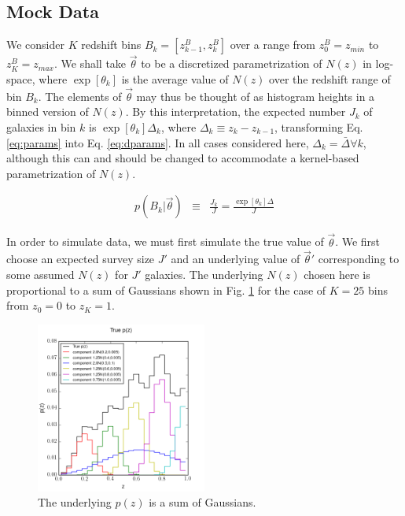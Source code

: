 \documentclass[preprint]{aastex}
\begin{document}
\subsection{Mock Data}
\label{sec:mock}

We consider $K$ redshift bins $B_{k}=[z^{B}_{k-1},z^{B}_{k}]$ over a range from $z^{B}_{0}=z_{min}$ to $z^{B}_{K}=z_{max}$.  We shall take $\vec{\theta}$ to be a discretized parametrization of $N(z)$ in log-space, where $\exp[\theta_{k}]$ is the average value of $N(z)$ over the redshift range of bin $B_{k}$.   The elements of $\vec{\theta}$ may thus be thought of as histogram heights in a binned version of $N(z)$.  By this interpretation, the expected number $J_{k}$ of galaxies in bin $k$ is $\exp[\theta_{k}]\Delta_{k}$, where $\Delta_{k}\equiv z_{k}-z_{k-1}$, transforming Eq. \ref{eq:params} into Eq. \ref{eq:dparams}.  In all cases considered here, $\Delta_{k}=\bar{\Delta}\forall k$, although this can and should be changed to accommodate a kernel-based parametrization of $N(z)$.

\begin{eqnarray}
\label{eq:dparams}
p(B_{k}|\vec{\theta}) &\equiv& \frac{J_{k}}{J} = \frac{\exp[\theta_{k}]\Delta}{J}
\end{eqnarray}

In order to simulate data, we must first simulate the true value of $\vec{\theta}$.  We first choose an expected survey size $J'$ and an underlying value of $\vec{\theta}'$ corresponding to some assumed $N(z)$ for $J'$ galaxies.  The underlying $N(z)$ chosen here is proportional to a sum of Gaussians shown in Fig. \ref{fig:physPz} for the case of $K=25$ bins from $z_{0}=0$ to $z_{K}=1$.

\begin{figure}
\label{fig:physPz}
\includegraphics[width=0.5\textwidth]{physPz.png}
\caption{The underlying $p(z)$ is a sum of Gaussians.}
\end{figure}
\end{document}
